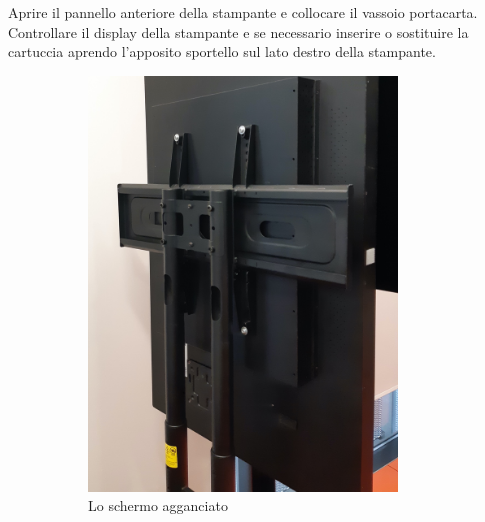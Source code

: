 \documentclass[12pt]{article}
\begin{document}
		Aprire il pannello anteriore della stampante e collocare il vassoio portacarta. Controllare il display della stampante e se necessario inserire o sostituire la cartuccia aprendo l'apposito sportello sul lato destro della stampante.
		
	\begin{figure}[H]
		\begin{subfigure}{0.5\textwidth}
                \includegraphics[width=0.9\textwidth]{img/stand_1.jpg}
                \caption*{Lo schermo agganciato}
        \end{subfigure}
		\begin{subfigure}{0.5\textwidth}

\end{subfigure}
\end{figure}
\end{document}

